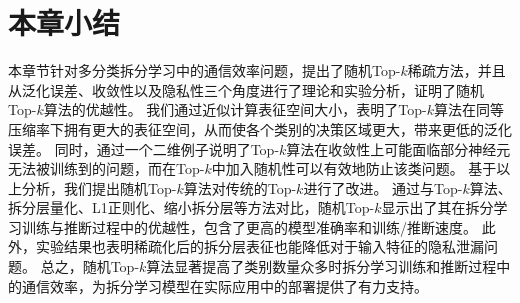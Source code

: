 \section{本章小结}
本章节针对多分类拆分学习中的通信效率问题，提出了随机Top-$k$稀疏方法，并且从泛化误差、收敛性以及隐私性三个角度进行了理论和实验分析，证明了随机Top-$k$算法的优越性。
%
我们通过近似计算表征空间大小，表明了Top-$k$算法在同等压缩率下拥有更大的表征空间，从而使各个类别的决策区域更大，带来更低的泛化误差。
%
同时，通过一个二维例子说明了Top-$k$算法在收敛性上可能面临部分神经元无法被训练到的问题，而在Top-$k$中加入随机性可以有效地防止该类问题。
%
基于以上分析，我们提出随机Top-$k$算法对传统的Top-$k$进行了改进。
%
通过与Top-$k$算法、拆分层量化、L1正则化、缩小拆分层等方法对比，随机Top-$k$显示出了其在拆分学习训练与推断过程中的优越性，包含了更高的模型准确率和训练/推断速度。
%
此外，实验结果也表明稀疏化后的拆分层表征也能降低对于输入特征的隐私泄漏问题。
%
总之，随机Top-$k$算法显著提高了类别数量众多时拆分学习训练和推断过程中的通信效率，为拆分学习模型在实际应用中的部署提供了有力支持。
